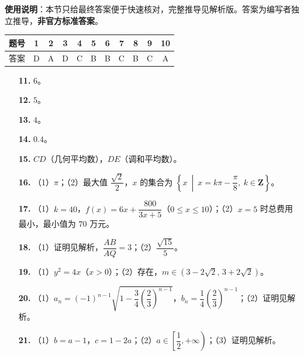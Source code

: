 
\begin{gknotice}
\textbf{使用说明}：本节只给最终答案便于快速核对，完整推导见解析版。答案为编写者独立推导，\textbf{非官方标准答案}。
\end{gknotice}

\begin{center}\begin{tabular}{ccccccccccc}
\toprule
题号 & 1 & 2 & 3 & 4 & 5 & 6 & 7 & 8 & 9 & 10 \\
\midrule
答案 & D & A & D & C & B & B & C & B & C & A \\
\bottomrule
\end{tabular}\end{center}

\begin{itemize}[leftmargin=2.6em]
  \item[\textbf{11.}] $6$。
  \item[\textbf{12.}] $5$。
  \item[\textbf{13.}] $4$。
  \item[\textbf{14.}] $0.4$。
  \item[\textbf{15.}] $CD$（几何平均数），$DE$（调和平均数）。
\end{itemize}

\begin{itemize}[leftmargin=2.6em]
  \item[\textbf{16.}] （1）$\pi$；（2）最大值 $\dfrac{\sqrt2}{2}$，$x$ 的集合为 $\left\{x\ \middle|\ x=k\pi-\dfrac\pi8,\ k\in\mathbf Z\right\}$。
  \item[\textbf{17.}] （1）$k=40$，$f(x)=6x+\dfrac{800}{3x+5}$（$0\leqslant x\leqslant10$）；（2）$x=5$ 时总费用最小，最小值为 $70$ 万元。
  \item[\textbf{18.}] （1）证明见解析，$\dfrac{AB}{AQ}=3$；（2）$\dfrac{\sqrt{15}}5$。
  \item[\textbf{19.}] （1）$y^2=4x$（$x>0$）；（2）存在，$m\in\left(3-2\sqrt2,\,3+2\sqrt2\right)$。
  \item[\textbf{20.}] （1）$a_n=(-1)^{n-1}\sqrt{1-\dfrac34\left(\dfrac23\right)^{n-1}}$，$b_n=\dfrac14\left(\dfrac23\right)^{n-1}$；（2）证明见解析。
  \item[\textbf{21.}] （1）$b=a-1$，$c=1-2a$；（2）$a\in\left[\dfrac12,+\infty\right)$；（3）证明见解析。
\end{itemize}
